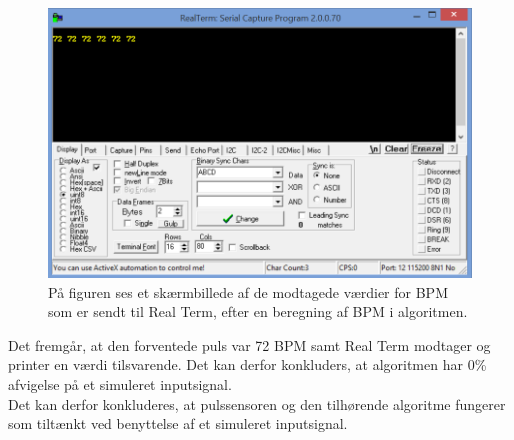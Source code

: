 \begin{figure}[H]
	\centering
	\includegraphics[scale=0.25]{figures/cDesign/Puls_test_realterm.png}
	\caption{På figuren ses et skærmbillede af de modtagede værdier for BPM som er sendt til Real Term, efter en beregning af BPM i algoritmen.}
\label{fig:test_puls_realterm}
\end{figure}
Det fremgår, at den forventede puls var 72 BPM samt Real Term modtager og printer en værdi tilsvarende. Det kan derfor konkluders, at algoritmen har 0\% afvigelse på et simuleret inputsignal. \\
Det kan derfor konkluderes, at pulssensoren og den tilhørende algoritme fungerer som tiltænkt ved benyttelse af et simuleret inputsignal. 

